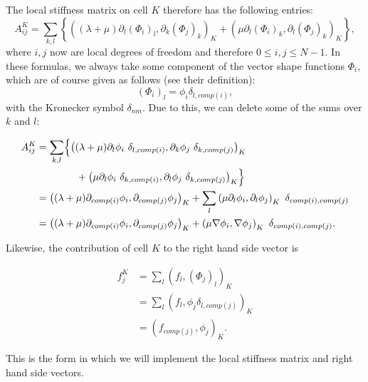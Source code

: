 \documentclass{article}
\begin{document}
The local stiffness matrix on cell $K$ therefore has the following entries:
$$
  A^K_{ij}
  =
  \sum_{k,l}
  \left\{
  \left(
    (\lambda+\mu) \partial_l (\Phi_i)_l, \partial_k (\Phi_j)_k
  \right)_K
  +
  \left(
    \mu \partial_l (\Phi_i)_k, \partial_l (\Phi_j)_k
  \right)_K
  \right\},
$$
where $i,j$ now are local degrees of freedom and therefore $0\le i,j \le N-1$. 
In these formulas, we always take some component of the vector shape functions
$\Phi_i$, which are of course given as follows (see their definition):
$$
  (\Phi_i)_l = \phi_i \delta_{l,comp(i)},
$$
with the Kronecker symbol $\delta_{nm}$. Due to this, we can delete some of
the sums over $k$ and $l$:
\begin{center}
\begin{align*}
  A^K_{ij}
  &=
  \sum_{k,l}
  \Bigl\{
  \left(
    (\lambda+\mu) \partial_l \phi_i\ \delta_{l,comp(i)}, 
                  \partial_k \phi_j\ \delta_{k,comp(j)}
  \right)_K
\\
  &\qquad\qquad +
  \left(
    \mu \partial_l \phi_i\ \delta_{k,comp(i)},
        \partial_l \phi_j\ \delta_{k,comp(j)}
  \right)_K
  \Bigr\}
\\
  &=
  \left(
    (\lambda+\mu) \partial_{comp(i)} \phi_i,
                  \partial_{comp(j)} \phi_j
  \right)_K
  +
  \sum_l
  \left(
    \mu \partial_l \phi_i,
        \partial_l \phi_j
  \right)_K
  \ \delta_{comp(i),comp(j)}
\\
  &=
  \left(
    (\lambda+\mu) \partial_{comp(i)} \phi_i,
                  \partial_{comp(j)} \phi_j
  \right)_K
  +
  \left(
    \mu \nabla \phi_i,
        \nabla \phi_j
  \right)_K
  \ \delta_{comp(i),comp(j)}.
\end{align*}
\end{center}

Likewise, the contribution of cell $K$ to the right hand side vector is
\begin{center}
\begin{align*}
  f^K_j
  &=
  \sum_l
  \left(
    f_l,
    (\Phi_j)_l
  \right)_K
\\
  &=
  \sum_l
  \left(
    f_l,
    \phi_j \delta_{l,comp(j)}
  \right)_K
\\
  &=
  \left(
    f_{comp(j)},
    \phi_j
  \right)_K.
\end{align*}  
\end{center}

This is the form in which we will implement the local stiffness matrix and
right hand side vectors.
\end{document}
